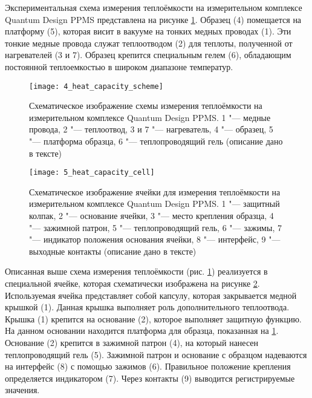 Экспериментальная схема измерения теплоёмкости на измерительном комплексе Quantum Design PPMS представлена на рисунке \ref{img:figure2}. Образец (4) помещается на платформу (5), которая висит в вакууме на тонких медных проводах (1). Эти тонкие медные провода служат теплоотводом (2) для теплоты, полученной от нагревателей (3 и 7). Образец крепится специальным гелем (6), обладающим постоянной теплоемкостью в широком диапазоне температур.
\begin{figure}[ht]
  \begin{minipage}[ht]{0.99\linewidth}\centering
    \texttt{[image: 4\_heat\_capacity\_scheme]} 
  \end{minipage}
       \caption[Схематическое изображение схемы измерения теплоёмкости на измерительном комплексе Quantum Design PPMS]{Схематическое изображение схемы измерения теплоёмкости на измерительном комплексе Quantum Design PPMS. 1 "--- медные провода, 2 "--- теплоотвод, 3 и 7 "--- нагреватель, 4 "--- образец, 5 "--- платформа образца, 6 "--- теплопроводящий гель (описание дано в тексте)}
    \label{img:figure2}
\end{figure}

\begin{figure}[p!]
  \begin{minipage}[ht]{0.99\linewidth}\centering
    \texttt{[image: 5\_heat\_capacity\_cell]} 
  \end{minipage}
       \caption[Схематическое изображение ячейки для измерения теплоёмкости на измерительном комплексе Quantum Design PPMS]{Схематическое изображение ячейки для измерения теплоёмкости на измерительном комплексе Quantum Design PPMS. 1 "--- защитный колпак, 2 "--- основание ячейки, 3 "--- место крепления образца, 4 "--- зажимной патрон, 5 "--- теплопроводящий гель, 6 "--- зажимы, 7 "--- индикатор положения основания ячейки, 8 "--- интерфейс, 9 "--- выходные контакты (описание дано в тексте)}
    \label{img:figure3}
\end{figure}


Описанная выше схема измерения теплоёмкости (рис. \ref{img:figure2}) реализуется в специальной ячейке, которая схематически изображена на рисунке \ref{img:figure3}. Используемая ячейка представляет собой капсулу, которая закрывается медной крышкой (1). Данная крышка выполняет  роль дополнительного теплоотвода. Крышка (1) крепится на основание (2), которое выполняет защитную функцию. На данном основании находится платформа для образца, показанная на \ref{img:figure2}. Основание (2) крепится в зажимной патрон (4), на который нанесен теплопроводящий гель (5). Зажимной патрон и основание с образцом надеваются на интерфейс (8) с помощью зажимов (6). Правильное положение крепления определяется индикатором (7). Через контакты (9) выводится регистрируемые значения.

